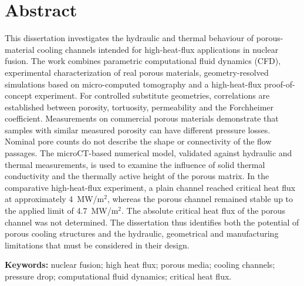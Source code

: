 \documentclass[a4paper]{article}
\begin{document}
\section*{Abstract}
This dissertation investigates the hydraulic and thermal behaviour of porous-material cooling channels intended for high-heat-flux applications in nuclear fusion. The work combines parametric computational fluid dynamics (CFD), experimental characterization of real porous materials, geometry-resolved simulations based on micro-computed tomography and a high-heat-flux proof-of-concept experiment. For controlled substitute geometries, correlations are established between porosity, tortuosity, permeability and the Forchheimer coefficient. Measurements on commercial porous materials demonstrate that samples with similar measured porosity can have different pressure losses. Nominal pore counts do not describe the shape or connectivity of the flow passages. The microCT-based numerical model, validated against hydraulic and thermal measurements, is used to examine the influence of solid thermal conductivity and the thermally active height of the porous matrix. In the comparative high-heat-flux experiment, a plain channel reached critical heat flux at approximately 4~MW/m$^2$, whereas the porous channel remained stable up to the applied limit of 4.7~MW/m$^2$. The absolute critical heat flux of the porous channel was not determined. The dissertation thus identifies both the potential of porous cooling structures and the hydraulic, geometrical and manufacturing limitations that must be considered in their design.

\noindent\textbf{Keywords:} nuclear fusion; high heat flux; porous media; cooling channels; pressure drop; computational fluid dynamics; critical heat flux.

\bigskip
\end{document}
